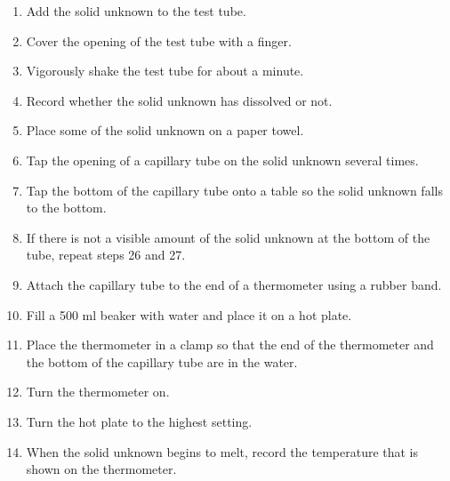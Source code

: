 \documentclass[12pt]{article}
\begin{document}
\begin{enumerate}
            \item Add the solid unknown to the test tube.
            \item Cover the opening of the test tube with a finger.
            \item Vigorously shake the test tube for about a minute.
            \item Record whether the solid unknown has dissolved or not.
            \item Place some of the solid unknown on a paper towel.
            \item Tap the opening of a capillary tube on the solid unknown several times.
            \item Tap the bottom of the capillary tube onto a table so the solid unknown falls to the bottom.
            \item If there is not a visible amount of the solid unknown at the bottom of the tube, repeat steps 26 and 27.
            \item Attach the capillary tube to the end of a thermometer using a rubber band.
            \item Fill a 500 ml beaker with water and place it on a hot plate.
            \item Place the thermometer in a clamp so that the end of the thermometer and the bottom of the capillary tube are in the water.
            \item Turn the thermometer on.
            \item Turn the hot plate to the highest setting.
            \item When the solid unknown begins to melt, record the temperature that is shown on the thermometer.
        \end{enumerate}
\end{document}
